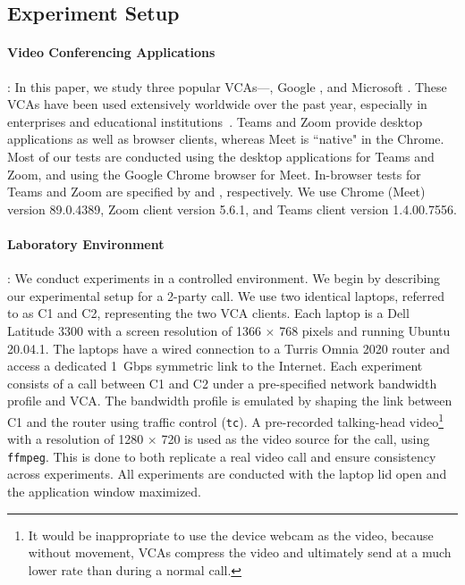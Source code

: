 \subsection{Experiment Setup} 
\label{subsec:setup}

\paragraph{Video Conferencing Applications}:
In this paper, we study three popular VCAs---\zoom, Google \meet, and Microsoft \teams.
These VCAs have been used extensively worldwide over the past year, especially
in enterprises and educational institutions~\cite{vca_share}.  Teams and Zoom
provide desktop applications as well as browser clients, whereas Meet is ``native"
in the Chrome. Most of our tests are conducted using the desktop
applications for Teams and Zoom, and using the Google Chrome browser for Meet.
In-browser tests for Teams and Zoom are specified by \textit{\teamsbrowser}
and \textit{\zoombrowser}, respectively. We use Chrome (Meet) version
89.0.4389, Zoom client version 5.6.1, and Teams client version 1.4.00.7556.


\paragraph{Laboratory Environment}:
We conduct experiments in a controlled environment.  We begin by describing our experimental setup for a 2-party call. We use two identical laptops, referred to as C1 and C2, representing the two VCA clients. Each laptop is a Dell Latitude 3300 with a screen resolution of 1366 $\times$
768 pixels and running Ubuntu 20.04.1. The laptops have a wired connection to
a Turris Omnia 2020 router and access a dedicated 1~Gbps symmetric link
to the Internet.  Each experiment consists of a call between C1 and C2 under a
pre-specified network bandwidth profile and VCA. The bandwidth profile is
emulated by shaping the link between C1 and the router using traffic control
(\texttt{tc}). A pre-recorded talking-head video\footnote{It would be inappropriate to use the 
device webcam as the video, because without movement, VCAs compress the video
and ultimately send at a much lower rate than during a normal call.} with a
resolution of 1280 $\times$ 720 is used as the video source for the call, using \texttt{ffmpeg}.
This is done to both replicate a real video call and ensure consistency across
experiments. All experiments are conducted with the laptop lid open and the
application window maximized. 

